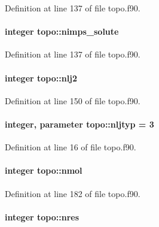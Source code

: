 Definition at line 137 of file topo.\-f90.

\hypertarget{classtopo_a92c8927aae134648de67450ea59d3471}{
\paragraph[{nimps\-\_\-solute}]{\setlength{\rightskip}{0pt plus 5cm}integer topo\-::nimps\-\_\-solute}}\label{classtopo_a92c8927aae134648de67450ea59d3471}


Definition at line 137 of file topo.\-f90.

\hypertarget{classtopo_a3e9ae63a574e391f4273239d99cde7dc}{
\paragraph[{nlj2}]{\setlength{\rightskip}{0pt plus 5cm}integer topo\-::nlj2}}\label{classtopo_a3e9ae63a574e391f4273239d99cde7dc}


Definition at line 150 of file topo.\-f90.

\hypertarget{classtopo_a81ba8fdc81bafeeebc27023f5e279b61}{
\paragraph[{nljtyp}]{\setlength{\rightskip}{0pt plus 5cm}integer, parameter topo\-::nljtyp = 3}}\label{classtopo_a81ba8fdc81bafeeebc27023f5e279b61}


Definition at line 16 of file topo.\-f90.

\hypertarget{classtopo_a7ea01882bbe30eae14b394d73abaa51e}{
\paragraph[{nmol}]{\setlength{\rightskip}{0pt plus 5cm}integer topo\-::nmol}}\label{classtopo_a7ea01882bbe30eae14b394d73abaa51e}


Definition at line 182 of file topo.\-f90.

\hypertarget{classtopo_a7084f73e1214464c07b24e59beb247d2}{
\paragraph[{nres}]{\setlength{\rightskip}{0pt plus 5cm}integer topo\-::nres}}\label{classtopo_a7084f73e1214464c07b24e59beb247d2}


